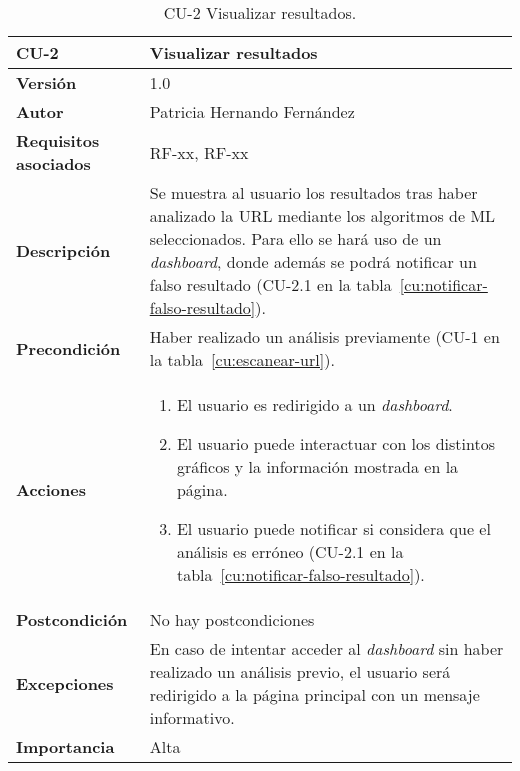 \begin{table}[p]
	\centering
	\begin{tabularx}{\linewidth}{ p{} p{} }
		\toprule
		\textbf{CU-2}    & \textbf{Visualizar resultados}\\
		\toprule
		\textbf{Versión}              & 1.0    \\
		\textbf{Autor}                & Patricia Hernando Fernández \\
		\textbf{Requisitos asociados} & RF-xx, RF-xx \\
		\textbf{Descripción}          & Se muestra al usuario los resultados tras haber analizado la URL mediante los algoritmos de ML seleccionados. Para ello se hará uso de un \textit{dashboard}, donde además se podrá notificar un falso resultado (CU-2.1 en la tabla~\ref{cu:notificar-falso-resultado}).\\
		\textbf{Precondición}         & Haber realizado un análisis previamente (CU-1 en la tabla~\ref{cu:escanear-url}). \\
		\textbf{Acciones}             &
		\begin{enumerate}
			\def\labelenumi{\arabic{enumi}.}
			\tightlist
			\item El usuario es redirigido a un \textit{dashboard}.
			\item El usuario puede interactuar con los distintos gráficos y la información mostrada en la página.
			\item El usuario puede notificar si considera que el análisis es erróneo (CU-2.1 en la tabla~\ref{cu:notificar-falso-resultado}).
		\end{enumerate}\\
		\textbf{Postcondición}        & No hay postcondiciones \\
		\textbf{Excepciones}          & En caso de intentar acceder al \textit{dashboard} sin haber realizado un análisis previo, el usuario será redirigido a la página principal con un mensaje informativo.\\
		\textbf{Importancia}          & Alta \\
		\bottomrule
	\end{tabularx}
	\caption{CU-2 Visualizar resultados.}
	\label{cu:visualizar-resultados}
\end{table}


